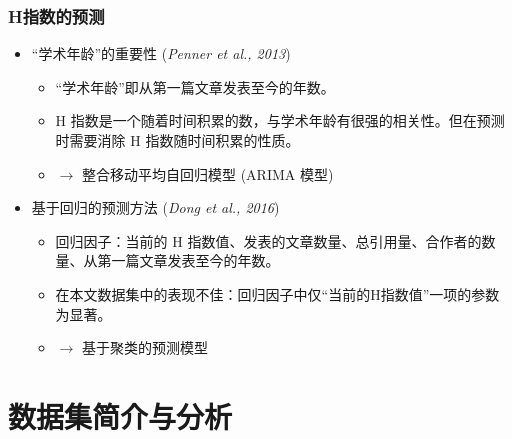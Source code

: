 \documentclass[11pt,compress,t, xcolor=table]{beamer}
\begin{document}
\begin{frame}
	\frametitle{H指数的预测}
	
\begin{itemize}
	\item “学术年龄”的重要性 (\textit{Penner et al., 2013})
	\begin{itemize}
		\item “学术年龄”即从第一篇文章发表至今的年数。
		\smallskip
		\item H 指数是一个随着时间积累的数，与学术年龄有很强的相关性。但在预测时需要消除 H 指数随时间积累的性质。
		\smallskip
		\item \textcolor{TsinghuaPurple}{$\rightarrow$ 整合移动平均自回归模型 (ARIMA 模型)}
	\end{itemize}
	\smallskip
	
	\item 基于回归的预测方法 (\textit{Dong et al., 2016})
	\begin{itemize}
		\item 回归因子：当前的 H 指数值、发表的文章数量、总引用量、合作者的数量、从第一篇文章发表至今的年数。
		\smallskip
		\item 在本文数据集中的表现不佳：回归因子中仅“当前的H指数值”一项的参数为显著。
		\smallskip
		\item \textcolor{TsinghuaPurple}{$\rightarrow$ 基于聚类的预测模型}
	\end{itemize}

\end{itemize}
\end{frame}

\section[数据集简介与分析]{数据集简介与分析}
\end{document}
